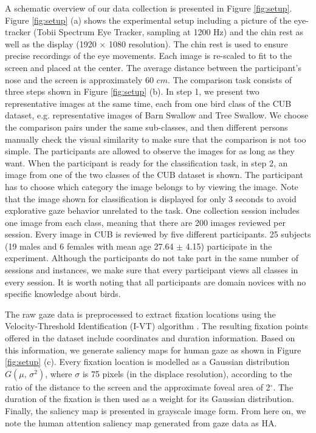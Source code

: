 \documentclass{bmvc2k}
\begin{document}
A schematic overview of our data collection is presented in Figure \ref{fig:setup}. Figure \ref{fig:setup} (a) shows the experimental setup including a picture of the eye-tracker (Tobii Spectrum Eye Tracker, sampling at 1200 Hz) and the chin rest as well as the display (1920 $\times$ 1080 resolution). The chin rest is used to ensure precise recordings of the eye movements. Each image is re-scaled to fit to the screen and placed at the center. The average distance between the participant's nose and the screen is approximately 60 $cm$. The comparison task consists of three steps shown in Figure \ref{fig:setup} (b). In step 1, we present two representative images at the same time, each from one bird class of the CUB dataset, e.g. representative images of Barn Swallow and Tree Swallow. We choose the comparison pairs under the same sub-classes, and then different persons manually check the visual similarity to make sure that the comparison is not too simple. The participants are allowed to observe the images for as long as they want. 
When the participant is ready for the classification task, in step 2, an image from one of the two classes of the CUB dataset is shown. The participant has to choose which category the image belongs to by viewing the image. Note that the image shown for classification is displayed for only 3 seconds to avoid explorative gaze behavior unrelated to the task. One collection session includes one image from each class, meaning that there are 200 images reviewed per session. 
Every image in CUB is reviewed by five different participants. 25 subjects (19 males and 6 females with mean age 27.64 $\pm$ 4.15) participate in the experiment. Although the participants do not take part in the same number of sessions and instances, we make sure that every participant views all classes in every session. It is worth noting that all participants are domain novices with no specific knowledge about birds.



 The raw gaze data is preprocessed to extract fixation locations using the Velocity-Threshold Identification (I-VT) algorithm \cite{olsen2012tobii}. The resulting fixation points offered in the dataset include coordinates and duration information. Based on this information, we generate saliency maps for human gaze as shown in Figure \ref{fig:setup} (c). Every fixation location is modelled as a Gaussian distribution ${G}(\mu,\,\sigma^{2})$, where $\sigma$ is 75 pixels (in the displace resolution), according to the ratio of the distance to the screen and the approximate foveal area of 2$^{\circ}$. The duration of the fixation is then used as a weight for its Gaussian distribution. Finally, the saliency map is presented in grayscale image form. From here on, we note the human attention saliency map generated from gaze data as HA.
\end{document}
